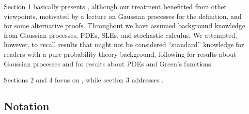 \documentclass[11pt,reqno]{amsart}
\numberwithin{equation}{section}
\begin{document}
Section 1 basically presents \cite{She07}, although our treatment benefitted from other viewpoints, motivated by a lecture on Gaussian processes for the definition, and \cite{Bourbaki} for some alternative proofs. Throughout we have assumed background knowledge from Gaussian processes, PDEs, SLEs, and stochastic calculus. We attempted, however, to recall results that might not be considered ``standard'' knowledge for readers with a pure probability theory background, following \cite{Nickl} for results about Gaussian processes and \cite{Evans} for results about PDEs and Green's functions.

Sections 2 and 4 focus on \cite{Dup10}, while section 3 addresses \cite{She15}.

\subsection*{Notation}
\end{document}
